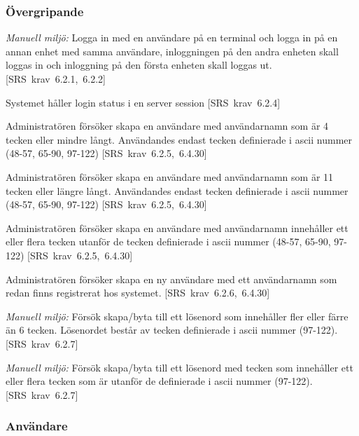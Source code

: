 \documentclass[a4paper]{article}
\def\reqinside{\hfil\penalty 100 \hfilneg \hbox}
\def \req [#1]{\reqinside{[SRS krav #1]}}
\begin{document}
\begin{appendices}
\subsubsection{Övergripande}

\begin{FT}
\item 
\emph{Manuell miljö:} Logga in med en användare på en terminal och logga in på en annan enhet med samma användare, inloggningen på den andra enheten skall loggas in och inloggning på den första enheten skall loggas ut.\req[6.2.1, 6.2.2]

\item
Systemet håller login status i en server session \req[6.2.4]

\item
Administratören försöker skapa en användare med användarnamn som är 4 tecken eller mindre långt. Användandes endast tecken definierade i ascii nummer (48-57, 65-90, 97-122)
\req[6.2.5, 6.4.30]

\item
Administratören försöker skapa en användare med användarnamn som är 11 tecken eller längre långt.
Användandes endast tecken definierade i ascii nummer (48-57, 65-90, 97-122)
\req[6.2.5, 6.4.30]

\item
Administratören försöker skapa en användare med användarnamn innehåller ett eller flera tecken utanför de tecken definierade i ascii nummer (48-57, 65-90, 97-122)
\req[6.2.5, 6.4.30]

\item
Administratören försöker skapa en ny användare med ett användarnamn som redan finns registrerat hos systemet.
\req[6.2.6, 6.4.30]

\item
\emph{Manuell miljö:} Försök skapa/byta till ett lösenord som innehåller fler eller färre än 6 tecken. Lösenordet består av tecken definierade i ascii nummer (97-122).
\req[6.2.7]

\item
\emph{Manuell miljö:} Försök skapa/byta till ett lösenord med tecken som innehåller ett eller flera tecken som är utanför de definierade i ascii nummer (97-122).
\req[6.2.7]
\end{FT}

\subsubsection{Användare}


\end{appendices}
\end{document}
